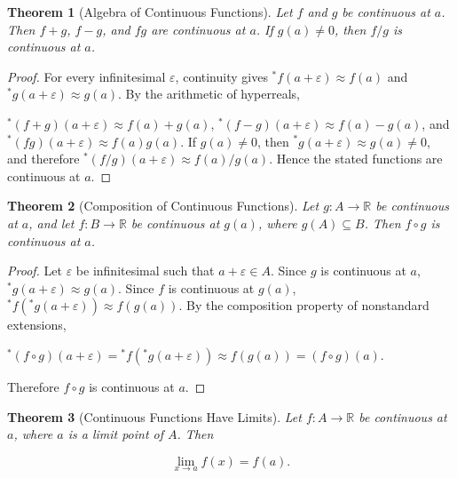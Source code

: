 \documentclass[10pt,a4paper]{book}
\newtheorem{theorem}{Theorem}[section]
\begin{document}
\begin{theorem}[Algebra of Continuous Functions]

    Let $f$ and $g$ be continuous at $a$. Then $f+g$, $f-g$, and $fg$ are
    continuous at $a$. If $g(a)\neq0$, then $f/g$ is continuous at $a$.

\end{theorem}

\begin{proof}

    For every infinitesimal $\varepsilon$, continuity gives
    ${}^*f(a+\varepsilon)\approx f(a)$ and ${}^*g(a+\varepsilon)\approx g(a)$. By
    the arithmetic of hyperreals,

    ${}^*(f+g)(a+\varepsilon)\approx f(a)+g(a)$,
    ${}^*(f-g)(a+\varepsilon)\approx f(a)-g(a)$, and
    ${}^*(fg)(a+\varepsilon)\approx f(a)g(a)$. If $g(a)\neq0$, then
    ${}^*g(a+\varepsilon)\approx g(a)\neq0$, and therefore
    ${}^*(f/g)(a+\varepsilon)\approx f(a)/g(a)$. Hence the stated functions
    are continuous at $a$.

\end{proof}

\begin{theorem}[Composition of Continuous Functions]

    Let $g:A\to\mathbb R$ be continuous at $a$, and let $f:B\to\mathbb R$ be
    continuous at $g(a)$, where $g(A)\subseteq B$. Then $f\circ g$ is continuous at
    $a$.

\end{theorem}

\begin{proof}

    Let $\varepsilon$ be infinitesimal such that $a+\varepsilon\in A$. Since $g$ is
    continuous at $a$, ${}^*g(a+\varepsilon)\approx g(a)$. Since $f$ is continuous
    at $g(a)$, ${}^*f({}^*g(a+\varepsilon))\approx f(g(a))$. By the composition
    property of nonstandard extensions,

    ${}^*(f\circ g)(a+\varepsilon)
        ={}^*f({}^*g(a+\varepsilon))
        \approx f(g(a))
        =(f\circ g)(a)$.

    Therefore $f\circ g$ is continuous at $a$.

\end{proof}

\begin{theorem}[Continuous Functions Have Limits]

    Let $f:A\to\mathbb R$ be continuous at $a$, where $a$ is a limit point of $A$.
    Then

    \[
        \lim_{x\to a}f(x)=f(a).
    \]

\end{theorem}
\end{document}
